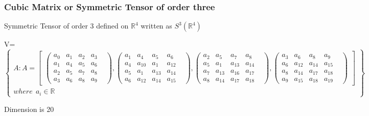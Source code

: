 \documentclass{beamer}
\newenvironment{changemargin}[2]{%
  \begin{list}{}{%
    \setlength{\topsep}{0pt}%
    \setlength{\leftmargin}{#1}%
    \setlength{\rightmargin}{#2}%
    \setlength{\listparindent}{\parindent}%
    \setlength{\itemindent}{\parindent}%
    \setlength{\parsep}{\parskip}%
  }%
  \item[]}{\end{list}}
\begin{document}
\begin{frame}
\frametitle{Cubic Matrix or Symmetric Tensor of order three} \begin{block}{}
\begin{itemize}
    \item Symmetric Tensor of order 3 defined on $\mathbb{R}^4$ written as $S^3(\mathbb{R}^4)$

\begin{changemargin}{-27pt}{0pt}
\newcommand\fontsizeX{\fontsize{4.3pt}{10pt}}
{\fontsizeX V=$\begin{Bmatrix} A: A=\begin{bmatrix}
  \begin{pmatrix}a_0&a_1&a_2&a_3&\\
  a_1&a_4&a_5&a_6&\\
  a_2&a_5&a_7&a_8&\\
  a_3&a_6&a_8&a_9&
\end{pmatrix},

 \begin{pmatrix}a_1&a_4&a_5&a_6&\\
  a_4&a_{10}&a_1&a_{12}&\\
  a_5&a_1&a_{13}&a_{14}&\\
  a_6&a_{12}&a_{14}&a_{15}&
\end{pmatrix},

 \begin{pmatrix}a_2&a_5&a_7&a_8&\\
  a_5&a_1&a_{13}&a_{14}&\\
  a_7&a_{13}&a_{16}&a_{17}&\\
  a_8&a_{14}&a_{17}&a_{18}&
\end{pmatrix},

 \begin{pmatrix}a_3&a_6&a_8&a_9&\\
  a_6&a_{12}&a_{14}&a_{15}&\\
  a_8&a_{14}&a_{17}&a_{18}&\\
  a_9&a_{15}&a_{18}&a_{19}&
\end{pmatrix}
\end{bmatrix}\\
where~~a_i \in \mathbb{R}
\end{Bmatrix}$}
\end{changemargin}
Dimension is 20
\end{itemize}
\end{block}
\end{frame}
\end{document}
